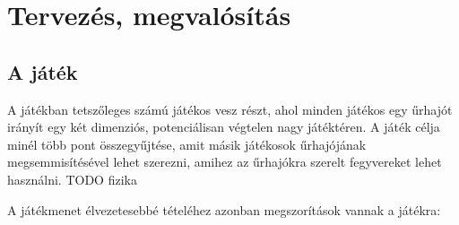 \chapter{Tervezés, megvalósítás}

\section{A játék}

A játékban tetszőleges számú játékos vesz részt, ahol minden játékos egy űrhajót
irányít egy két dimenziós, potenciálisan végtelen nagy játéktéren. A játék célja
minél több pont összegyűjtése, amit másik játékosok űrhajójának
megsemmisítésével lehet szerezni, amihez az űrhajókra szerelt fegyvereket lehet
használni. TODO fizika

A játékmenet élvezetesebbé tételéhez azonban megszorítások vannak a játékra:

